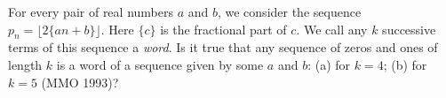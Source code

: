 For every pair of real numbers $a$ and $b$, we consider the sequence $p_n = \lfloor 2\{an + b\} \rfloor$. Here $\{c\}$ is the fractional part of $c$. We call any $k$ successive terms of this sequence a \emph{word}. Is it true that any sequence of zeros and ones of length $k$ is a word of a sequence given by some $a$ and $b$: (a) for $k = 4$; (b) for $k = 5$ (MMO 1993)?
